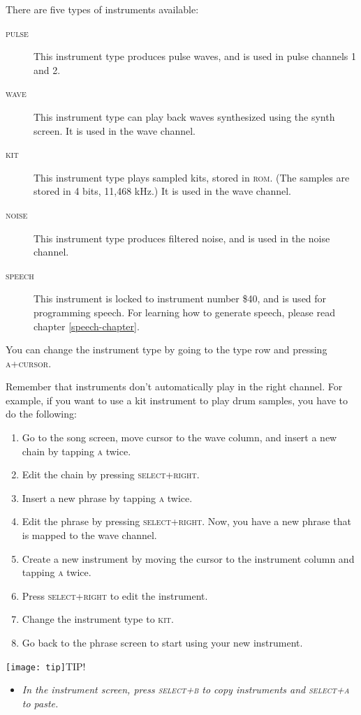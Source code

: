 There are five types of instruments available:

\begin{description}
\item[\textsc{pulse}] This instrument type produces pulse waves, and is used in pulse channels 1 and 2.
\item[\textsc{wave}] This instrument type can play back waves synthesized using the synth screen. It is used in the wave channel.
\item[\textsc{kit}] This instrument type plays sampled kits, stored in \textsc{rom}. (The samples are stored in 4 bits, 11,468 kHz.) It is used in the wave channel.
\item[\textsc{noise}] This instrument type produces filtered noise, and is used in the noise channel.
\item[\textsc{speech}] This instrument is locked to instrument number \$40, and is used for programming speech. For learning how to generate speech, please read chapter \ref{speech-chapter}.
\end{description}

You can change the instrument type by going to the type row and pressing \textsc{a+cursor}.

Remember that instruments don't automatically play in the right channel. For example, if you want to use a kit instrument to play drum samples, you have to do the following:

\begin{enumerate}
\item Go to the song screen, move cursor to the wave column, and insert a new chain by tapping \textsc{a} twice.
\item	Edit the chain by pressing \textsc{select+right}.
\item	Insert a new phrase by tapping \textsc{a} twice.
\item	Edit the phrase by pressing \textsc{select+right}. Now, you have a new phrase that is mapped to the wave channel.
\item	Create a new instrument by moving the cursor to the instrument column and tapping \textsc{a} twice.
\item	Press \textsc{select+right} to edit the instrument.
\item	Change the instrument type to \textsc{kit}.
\item	Go back to the phrase screen to start using your new instrument.
\end{enumerate}

\texttt{[image: tip]}TIP!
\begin{itemize}
	\item \textit{In the instrument screen, press \textsc{select+b} to copy instruments and \textsc{select+a} to paste.}
\end{itemize}


